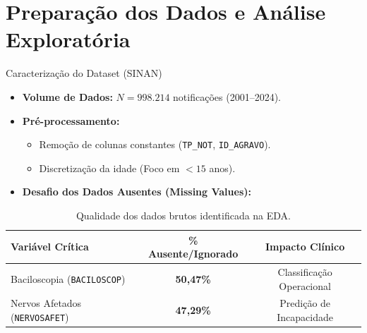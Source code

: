 \documentclass[10pt, aspectratio=169]{beamer}
\begin{document}
\section{Preparação dos Dados e Análise Exploratória}

\begin{frame}{Caracterização do Dataset (SINAN)}
    \begin{itemize}
        \item \textbf{Volume de Dados:} $N = 998.214$ notificações (2001--2024).
        \item \textbf{Pré-processamento:}
            \begin{itemize}
                \item Remoção de colunas constantes (\texttt{TP\_NOT}, \texttt{ID\_AGRAVO}).
                \item Discretização da idade (Foco em $<15$ anos).
            \end{itemize}
        \item \textbf{Desafio dos Dados Ausentes (Missing Values):}
    \end{itemize}
    
    \begin{table}
        \centering
        \begin{tabular}{lcc}
            \toprule
            \textbf{Variável Crítica} & \textbf{\% Ausente/Ignorado} & \textbf{Impacto Clínico} \\ \midrule
            Baciloscopia (\texttt{BACILOSCOP}) & \textbf{50,47\%} & Classificação Operacional \\
            Nervos Afetados (\texttt{NERVOSAFET}) & \textbf{47,29\%} & Predição de Incapacidade \\ \bottomrule
        \end{tabular}
        \caption{Qualidade dos dados brutos identificada na EDA.}
    \end{table}
\end{frame}
\end{document}
